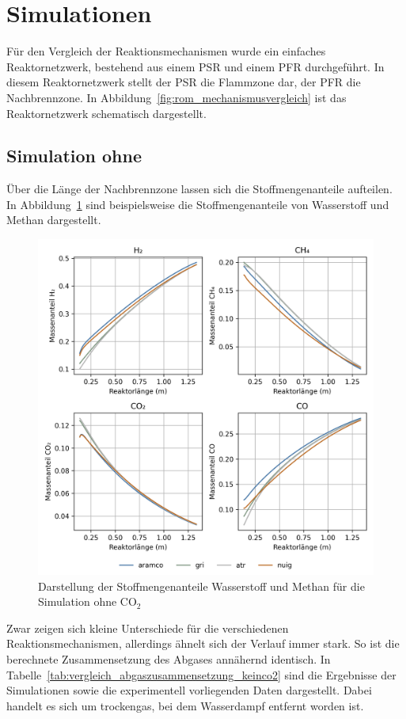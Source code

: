 \documentclass[footmark=none]{tubaf-thesis}
\begin{document}
    \section{Simulationen}
        Für den Vergleich der Reaktionsmechanismen wurde ein einfaches Reaktornetzwerk, bestehend aus einem PSR und einem PFR durchgeführt. In diesem Reaktornetzwerk stellt der PSR die Flammzone dar, der PFR die Nachbrennzone. In Abbildung~\ref{fig:rom_mechanismusvergleich} ist das Reaktornetzwerk schematisch dargestellt.
        \subsection{Simulation ohne }
        Über die Länge der Nachbrennzone lassen sich die Stoffmengenanteile aufteilen. In Abbildung~\ref{fig:vergleich_h2_ch4_keinco2} sind beispielsweise die Stoffmengenanteile von Wasserstoff und Methan dargestellt.
        \begin{figure}[H]
            \centering
            \includegraphics[width=0.9\linewidth]{img_py/H2_CH4_CO_CO2_keinCO2.png}
            \caption{Darstellung der Stoffmengenanteile Wasserstoff und Methan für die Simulation ohne CO$_2$}\label{fig:vergleich_h2_ch4_keinco2}
        \end{figure}
        Zwar zeigen sich kleine Unterschiede für die verschiedenen Reaktionsmechanismen, allerdings ähnelt sich der Verlauf immer stark. So ist die berechnete Zusammensetzung des Abgases annähernd identisch. In Tabelle~\ref{tab:vergleich_abgaszusammensetzung_keinco2} sind die Ergebnisse der Simulationen sowie die experimentell vorliegenden Daten dargestellt. Dabei handelt es sich um trockengas, bei dem Wasserdampf entfernt worden ist. 
\end{document}
